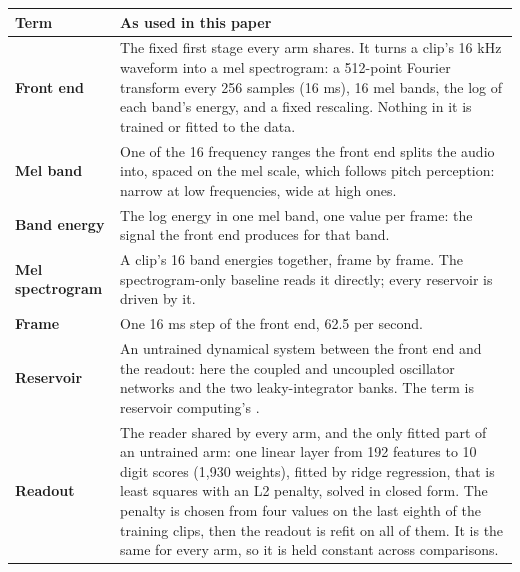 \documentclass[10pt]{article}
\newcounter{none} %
\begin{document}
{\def\LTcaptype{none} %
\begin{longtable}[]{@{}
  >{\raggedright\arraybackslash}p{}
  >{\raggedright\arraybackslash}p{}@{}}
\toprule\noalign{}
\begin{minipage}[b]{\linewidth}\raggedright
Term
\end{minipage} & \begin{minipage}[b]{\linewidth}\raggedright
As used in this paper
\end{minipage} \\
\midrule\noalign{}
\endhead
\bottomrule\noalign{}
\endlastfoot
\textbf{Front end} & The fixed first stage every arm shares. It turns a
clip's 16 kHz waveform into a mel spectrogram: a 512-point Fourier
transform every 256 samples (16 ms), 16 mel bands, the log of each
band's energy, and a fixed rescaling. Nothing in it is trained or fitted
to the data. \\
\cmidrule{1-2}\textbf{Mel band} & One of the 16 frequency ranges the
front end splits the audio into, spaced on the mel scale, which follows
pitch perception: narrow at low frequencies, wide at high ones. \\
\cmidrule{1-2}\textbf{Band energy} & The log energy in one mel band, one
value per frame: the signal the front end produces for that band. \\
\cmidrule{1-2}\textbf{Mel spectrogram} & A clip's 16 band energies
together, frame by frame. The spectrogram-only baseline reads it
directly; every reservoir is driven by it. \\
\cmidrule{1-2}\textbf{Frame} & One 16 ms step of the front end, 62.5 per
second. \\
\cmidrule{1-2}\textbf{Reservoir} & An untrained dynamical system between
the front end and the readout: here the coupled and uncoupled oscillator
networks and the two leaky-integrator banks. The term is reservoir
computing's \citep{jaeger2001, maass2002}. \\
\cmidrule{1-2}\textbf{Readout} & The reader shared by every arm, and the
only fitted part of an untrained arm: one linear layer from 192 features
to 10 digit scores (1,930 weights), fitted by ridge regression, that is
least squares with an L2 penalty, solved in closed form. The penalty is
chosen from four values on the last eighth of the training clips, then
the readout is refit on all of them. It is the same for every arm, so it
is held constant across comparisons. \\

\end{longtable}}
\end{document}
